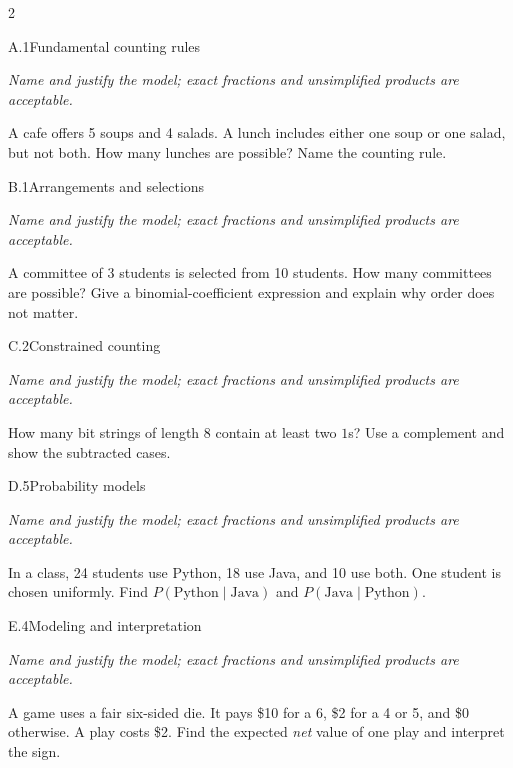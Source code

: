 \documentclass[9pt]{extarticle}
\begin{document}
\begin{multicols}{2}
\begin{CoreProblem}{A.1}{Fundamental counting rules}
{\scriptsize\textit{Name and justify the model; exact fractions and unsimplified products are acceptable.}\par}
A cafe offers 5 soups and 4 salads. A lunch includes either one soup
    or one salad, but not both. How many lunches are possible? Name the counting
    rule.
\end{CoreProblem}
\begin{CoreProblem}{B.1}{Arrangements and selections}
{\scriptsize\textit{Name and justify the model; exact fractions and unsimplified products are acceptable.}\par}
A committee of 3 students is selected from 10 students. How many
    committees are possible? Give a binomial-coefficient expression and explain
    why order does not matter.
\end{CoreProblem}
\begin{CoreProblem}{C.2}{Constrained counting}
{\scriptsize\textit{Name and justify the model; exact fractions and unsimplified products are acceptable.}\par}
How many bit strings of length 8 contain at least two $1$s? Use a
    complement and show the subtracted cases.
\end{CoreProblem}
\columnbreak
\begin{CoreProblem}{D.5}{Probability models}
{\scriptsize\textit{Name and justify the model; exact fractions and unsimplified products are acceptable.}\par}
In a class, 24 students use Python, 18 use Java, and 10 use both.
    One student is chosen uniformly. Find
    $P(\text{Python}\mid\text{Java})$ and
    $P(\text{Java}\mid\text{Python})$.
\end{CoreProblem}
\begin{CoreProblem}{E.4}{Modeling and interpretation}
{\scriptsize\textit{Name and justify the model; exact fractions and unsimplified products are acceptable.}\par}
A game uses a fair six-sided die. It pays \$10 for a 6, \$2 for a 4
    or 5, and \$0 otherwise. A play costs \$2. Find the expected \emph{net}
    value of one play and interpret the sign.
\end{CoreProblem}
\end{multicols}
\CoreWorkArea
\FormBreak
{}
\end{document}
